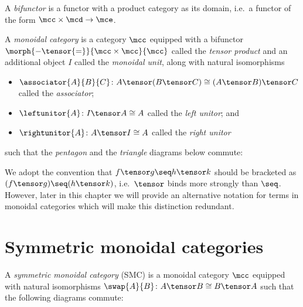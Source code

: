 \begin{definition}[Bifunctor]
    A \emph{bifunctor} is a functor with a product category as its domain, i.e.\
    a functor of the form \(\mcc \times \mcd \to \mce\).
\end{definition}

\begin{definition}
    A \emph{monoidal category} is a category \(\mcc\) equipped with a
    bifunctor \(\morph{{-} \tensor {=}}{\mcc \times \mcc}{\mcc}\) called the
    \emph{tensor product} and an additional object \(I\) called the
    \emph{monoidal unit},
    along with natural isomorphisms
    \begin{itemize}
        \item \(
            \associator{A}{B}{C}
            \colon
            A \tensor (B \tensor C)
            \cong
            (A \tensor B) \tensor C
            \) called the \emph{associator};
        \item \(
            \leftunitor{A}
            \colon
            I \tensor A
            \cong
            A
            \) called the \emph{left unitor}; and
        \item \(
            \rightunitor{A}
            \colon
            A \tensor I
            \cong
            A
            \) called the \emph{right unitor}
    \end{itemize}
    such that the \emph{pentagon} and the \emph{triangle} diagrams below
    commute:
    \begin{center}
        
        
    \end{center}
\end{definition}

We adopt the convention that \(f \tensor g \seq h \tensor k\) should be
bracketed as \((f \tensor g) \seq (h \tensor k)\), i.e.\ \(\tensor\) binds
more strongly than \(\seq\).
However, later in this chapter we will provide an alternative notation for terms
in monoidal categories which will make this distinction redundant.

\section{Symmetric monoidal categories}


\begin{definition}
    A \emph{symmetric monoidal category} (SMC) is a monoidal category \(\mcc\)
    equipped with natural isomorphisms \(
        \swap{A}{B} \colon A \tensor B \cong B \tensor A
    \) such that the following diagrams commute:
    \begin{center}
        
        

        \vspace{1em}

        
    \end{center}
\end{definition}

